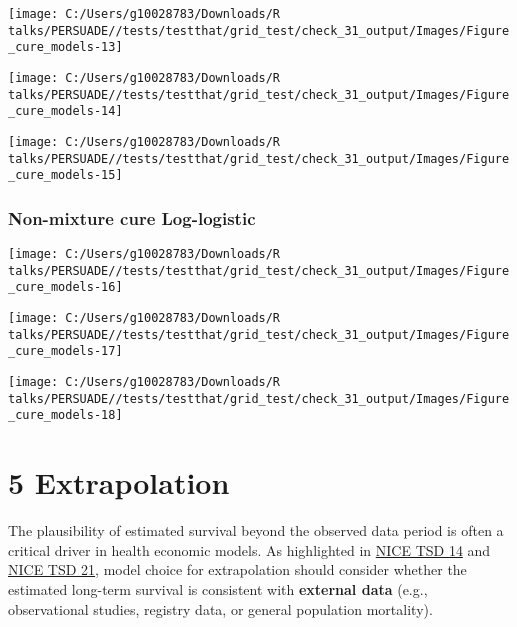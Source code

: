 \documentclass[
]{article}
\begin{document}
\begin{flushleft}\texttt{[image: C:/Users/g10028783/Downloads/R talks/PERSUADE//tests/testthat/grid\_test/check\_31\_output/Images/Figure\_cure\_models-13]} \end{flushleft}

\begin{flushleft}\texttt{[image: C:/Users/g10028783/Downloads/R talks/PERSUADE//tests/testthat/grid\_test/check\_31\_output/Images/Figure\_cure\_models-14]} \end{flushleft}

\begin{flushleft}\texttt{[image: C:/Users/g10028783/Downloads/R talks/PERSUADE//tests/testthat/grid\_test/check\_31\_output/Images/Figure\_cure\_models-15]} \end{flushleft}

\clearpage

\subsubsection{Non-mixture cure
Log-logistic}\label{non-mixture-cure-log-logistic}

\begin{flushleft}\texttt{[image: C:/Users/g10028783/Downloads/R talks/PERSUADE//tests/testthat/grid\_test/check\_31\_output/Images/Figure\_cure\_models-16]} \end{flushleft}

\begin{flushleft}\texttt{[image: C:/Users/g10028783/Downloads/R talks/PERSUADE//tests/testthat/grid\_test/check\_31\_output/Images/Figure\_cure\_models-17]} \end{flushleft}

\begin{flushleft}\texttt{[image: C:/Users/g10028783/Downloads/R talks/PERSUADE//tests/testthat/grid\_test/check\_31\_output/Images/Figure\_cure\_models-18]} \end{flushleft}

\clearpage

\section{5 Extrapolation}\label{extrapolation}

The plausibility of estimated survival beyond the observed data period
is often a critical driver in health economic models. As highlighted in
\href{https://nicedsu.org.uk/wp-content/uploads/2016/03/NICE-DSU-TSD-Survival-analysis.updated-March-2013.v2.pdf}{NICE
TSD 14} and \href{https://www.sheffield.ac.uk/media/34188/download}{NICE
TSD 21}, model choice for extrapolation should consider whether the
estimated long-term survival is consistent with \textbf{external data}
(e.g., observational studies, registry data, or general population
mortality).
\end{document}
